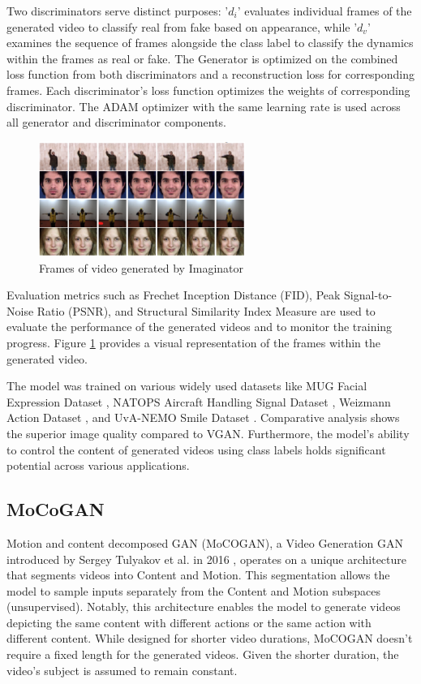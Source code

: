 \documentclass[12pt,twoside,a4paper,parskip]{scrbook} %
\begin{document}
Two discriminators serve distinct purposes: '$d_i$' evaluates individual frames of the generated video to classify real from fake based on appearance, while '$d_v$' examines the sequence of frames alongside the class label to classify the dynamics within the frames as real or fake. The Generator is optimized on the combined loss function from both discriminators and a reconstruction loss for corresponding frames. Each discriminator's loss function optimizes the weights of corresponding discriminator. The ADAM optimizer with the same learning rate is used across all generator and discriminator components.
\begin{figure}[H]
    \centering
    \includegraphics[width=0.6\textwidth]{Images/Imaginator.png}
    \caption{Frames of  video generated by Imaginator}
    \label{fig:Imaginator}
  \end{figure}
  
Evaluation metrics such as Frechet Inception Distance (FID), Peak Signal-to-Noise Ratio (PSNR), and Structural Similarity Index Measure are used to evaluate the performance of the generated videos and to monitor the training progress. Figure \ref{fig:Imaginator}  provides a visual representation of the frames within the generated video. 

The model was trained on various widely used datasets like MUG Facial Expression Dataset \cite{13_MUG}, NATOPS Aircraft Handling Signal Dataset \cite{14_aircraft}, Weizmann Action Dataset \cite{15_act_rec}, and UvA-NEMO Smile Dataset \cite{16_face}. Comparative analysis shows the superior image quality compared to VGAN. Furthermore, the model's ability to control the content of generated videos using class labels holds significant potential across various applications.
\subsection{MoCoGAN}
Motion and content decomposed GAN (MoCOGAN), a Video Generation GAN introduced by Sergey Tulyakov et al. in 2016 \cite{10_mocogan}, operates on a unique architecture that segments videos into Content and Motion. This segmentation allows the model to sample inputs separately from the Content and Motion subspaces (unsupervised). Notably, this architecture enables the model to generate videos depicting the same content with different actions or the same action with different content. While designed for shorter video durations, MoCOGAN doesn't require a fixed length for the generated videos. Given the shorter duration, the video's subject is assumed to remain constant.
\end{document}

